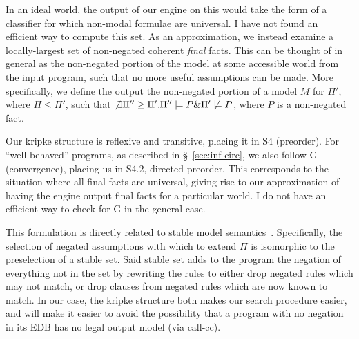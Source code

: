 In an ideal world, the output of our engine on this would take the form of a classifier for which non-modal formulae are universal.
I have not found an efficient way to compute this set.
As an approximation, we instead examine a locally-largest set of non-negated coherent \emph{final} facts.
This can be thought of in general as the non-negated portion of the model at some accessible world from the input program, such that no more useful assumptions can be made.
More specifically, we define the output the non-negated portion of a model $M$ for $\Pi'$, where $\Pi \leq \Pi'$, such that $\not \exists \Pi'' \geq \Pi'. \Pi'' \models P \& \Pi' \not \models P$, where $P$ is a non-negated fact.

Our kripke structure is reflexive and transitive, placing it in S4 (preorder).
For ``well behaved'' programs, as described in \S~\ref{sec:inf-circ}, we also follow G (convergence), placing us in S4.2, directed preorder.
This corresponds to the situation where all final facts are universal, giving rise to our approximation of having the engine output final facts for a particular world.
I do not have an efficient way to check for G in the general case.

This formulation is directly related to stable model semantics~\cite{stable-model}.
Specifically, the selection of negated assumptions with which to extend $\Pi$ is isomorphic to the preselection of a stable set.
Said stable set adds to the program the negation of everything not in the set by rewriting the rules to either drop negated rules which may not match, or drop clauses from negated rules which are now known to match.
In our case, the kripke structure both makes our search procedure easier, and will make it easier to avoid the possibility that a program with no negation in its EDB has no legal output model (via call-cc).

